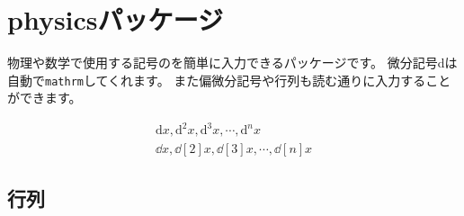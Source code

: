 \section{physicsパッケージ}

物理や数学で使用する記号のを簡単に入力できるパッケージです。
微分記号dは自動で\texttt{mathrm}してくれます。
また偏微分記号や行列も読む通りに入力することができます。

\begin{align}
    \mathrm{d}x, \mathrm{d}^{2}x, \mathrm{d}^{3}x, \cdots, \mathrm{d}^{n}x\\
    \dd{x}, \dd[2]{x}, \dd[3]{x}, \cdots, \dd[n]{x}
\end{align}

\subsection{行列}
